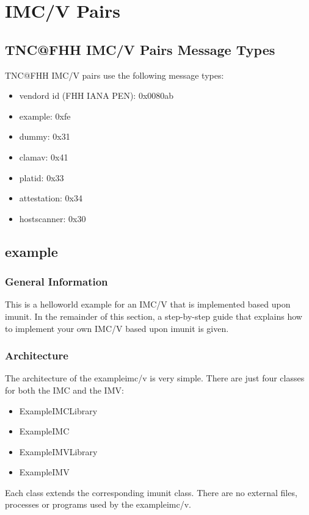 \documentclass[a4paper,10pt]{scrartcl}
\begin{document}
\section{IMC/V Pairs}
\subsection{TNC@FHH IMC/V Pairs Message Types}\label{sec:message-types}
TNC@FHH IMC/V pairs use the following message types:
\begin{itemize}
	\item vendord id (FHH IANA PEN): 0x0080ab
	\item example: 0xfe
	\item dummy: 0x31
	\item clamav: 0x41
	\item platid: 0x33
	\item attestation: 0x34
	\item hostscanner: 0x30
\end{itemize}

\subsection{example}\label{sec:example-imcv}
\subsubsection{General Information}
This is a helloworld example for an IMC/V that is implemented based upon imunit.
In the remainder of this section, a step-by-step guide that explains how to implement
your own IMC/V based upon imunit is given.

\subsubsection{Architecture}
The architecture of the exampleimc/v is very simple. There are just four classes
for both the IMC and the IMV:
\begin{itemize}
	\item ExampleIMCLibrary
	\item ExampleIMC
	\item ExampleIMVLibrary
	\item ExampleIMV
\end{itemize}
Each class extends the corresponding imunit class. There are no external files,
processes or programs used by the exampleimc/v.
\end{document}
